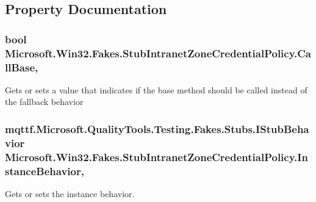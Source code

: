 \subsection{Property Documentation}
\hypertarget{class_microsoft_1_1_win32_1_1_fakes_1_1_stub_intranet_zone_credential_policy_a594310d5fe7b9fcf55b61f604d88e42e}{
\subsubsection[{Call\-Base}]{\setlength{\rightskip}{0pt plus 5cm}bool Microsoft.\-Win32.\-Fakes.\-Stub\-Intranet\-Zone\-Credential\-Policy.\-Call\-Base\hspace{0.3cm}{\ttfamily [get]}, {\ttfamily [set]}}}\label{class_microsoft_1_1_win32_1_1_fakes_1_1_stub_intranet_zone_credential_policy_a594310d5fe7b9fcf55b61f604d88e42e}


Gets or sets a value that indicates if the base method should be called instead of the fallback behavior

\hypertarget{class_microsoft_1_1_win32_1_1_fakes_1_1_stub_intranet_zone_credential_policy_a3c3933d137deaa83e86006dbc70e7acf}{
\subsubsection[{Instance\-Behavior}]{\setlength{\rightskip}{0pt plus 5cm}mqttf.\-Microsoft.\-Quality\-Tools.\-Testing.\-Fakes.\-Stubs.\-I\-Stub\-Behavior Microsoft.\-Win32.\-Fakes.\-Stub\-Intranet\-Zone\-Credential\-Policy.\-Instance\-Behavior\hspace{0.3cm}{\ttfamily [get]}, {\ttfamily [set]}}}\label{class_microsoft_1_1_win32_1_1_fakes_1_1_stub_intranet_zone_credential_policy_a3c3933d137deaa83e86006dbc70e7acf}


Gets or sets the instance behavior.

